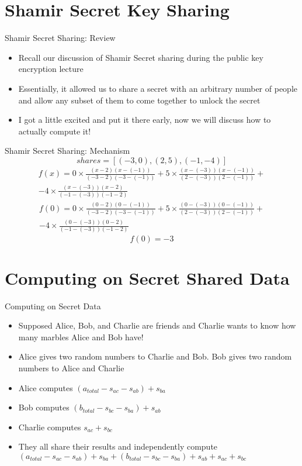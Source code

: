 \documentclass[handout]{beamer}
\begin{document}
\section{Shamir Secret Key Sharing}

\begin{frame}{Shamir Secret Sharing: Review}
  \begin{itemize}
    \item \pause Recall our discussion of Shamir Secret sharing during the public key encryption lecture
    \item \pause Essentially, it allowed us to share a secret with an arbitrary number of people and allow any subset of them to come together to unlock the secret \item \pause I got a little excited and put it there early, now we will discuss how to actually compute it!
  \end{itemize}
\end{frame}

\begin{frame}{Shamir Secret Sharing: Mechanism}
  \pause
  \[shares = [(-3, 0), (2, 5), (-1, -4)]\]
  \pause
  \begin{multline*}
  f(x) = 0 \times \frac{(x - 2)(x-(-1))}{(-3 - 2)(-3-(-1))} + 5 \times \frac{(x-(-3))(x - (-1))}{(2 - (-3))(2 - (-1))} + \\ -4 \times \frac{(x - (-3))(x - 2)}{(-1 -(-3))(-1 - 2)}
  \end{multline*}
  \pause
  \begin{multline*}
  f(0) = 0 \times \frac{(0 - 2)(0-(-1))}{(-3 - 2)(-3-(-1))} + 5 \times \frac{(0-(-3))(0 - (-1))}{(2 - (-3))(2 - (-1))} +\\ -4 \times \frac{(0 - (-3))(0 - 2)}{(-1 -(-3))(-1 - 2)}
  \end{multline*}
  \pause
  \[f(0) = -3\]
\end{frame}

\section{Computing on Secret Shared Data}

\begin{frame}{Computing on Secret Data}
  \begin{itemize}
    \item \pause Supposed Alice, Bob, and Charlie are friends and Charlie wants to know how many marbles Alice and Bob have!
    \item \pause Alice gives two random numbers to Charlie and Bob. \pause Bob gives two random numbers to Alice and Charlie
    \item \pause Alice computes \((a_{total} - s_{ac} - s_{ab}) + s_{ba}\)
    \item \pause Bob computes \((b_{total} - s_{bc} - s_{ba}) + s_{ab}\)
    \item \pause Charlie computes \(s_{ac}+ s_{bc}\)
    \item \pause They all share their results and independently compute \((a_{total} - s_{ac} - s_{ab}) + s_{ba} + (b_{total} - s_{bc} - s_{ba}) + s_{ab} + s_{ac}+ s_{bc}\)
  \end{itemize}
\end{frame}
\end{document}
